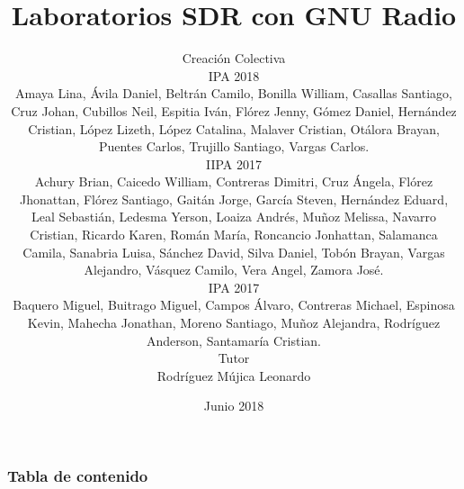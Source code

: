 \documentclass[usenames,dvipsnames]{beamer}
\title[Laboratorios SDR con GNU Radio]{
  Laboratorios SDR con GNU Radio}
\author[Ingeniería Electrónica]{Creación Colectiva\\
\tiny 
IPA 2018\\
Amaya Lina, Ávila Daniel, Beltrán Camilo, Bonilla William, Casallas Santiago, Cruz Johan, Cubillos Neil, Espitia Iván, Flórez Jenny, Gómez Daniel, Hernández Cristian, López Lizeth, López Catalina, Malaver Cristian, Otálora Brayan, Puentes Carlos, Trujillo Santiago, Vargas Carlos. \\
IIPA 2017\\
Achury Brian, Caicedo William, Contreras Dimitri, Cruz Ángela, Flórez Jhonattan, Flórez Santiago, Gaitán Jorge, García Steven, Hernández Eduard, Leal Sebastián, Ledesma Yerson, Loaiza Andrés, Muñoz Melissa, Navarro Cristian, Ricardo Karen, Román María, Roncancio Jonhattan, Salamanca Camila, Sanabria Luisa, Sánchez David, Silva Daniel, Tobón Brayan, Vargas Alejandro, Vásquez Camilo, Vera Angel, Zamora José.\\
IPA 2017\\
Baquero Miguel, Buitrago Miguel, Campos Álvaro, Contreras Michael, Espinosa Kevin, Mahecha Jonathan, Moreno Santiago, Muñoz Alejandra, Rodríguez Anderson, Santamaría Cristian.\\
\scriptsize
Tutor\\ Rodríguez Mújica Leonardo}
\institute[Universidad de Cundinamarca]{
  Facultad de Ingeniería\\
  Universidad de Cundinamarca}
\date{Junio 2018}
\begin{document}
\let\olditemize\itemize
\def\itemize{\olditemize\itemsep=4pt }
\footnotesize

\begin{frame}
  \titlepage
\end{frame}


\begin{frame}
  \frametitle{Tabla de contenido}

  \tableofcontents
\end{frame}























\end{document}
